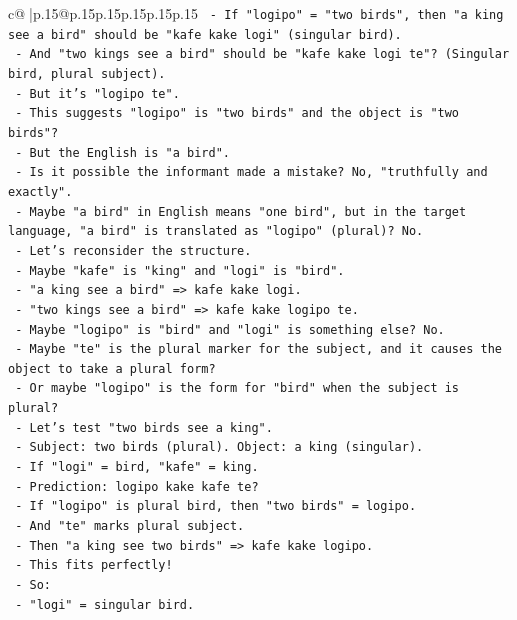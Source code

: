 \documentclass{article}
\begin{document}
{\begin{supertabular}{c@{$\;$}|p{.15\linewidth}@{}p{.15\linewidth}p{.15\linewidth}p{.15\linewidth}p{.15\linewidth}p{.15\linewidth}}
{{{\texttt{  {-} If "logipo" = "two birds", then "a king see a bird" should be "kafe kake logi" (singular bird).} \\
\texttt{  {-} And "two kings see a bird" should be "kafe kake logi te"? (Singular bird, plural subject).} \\
\texttt{  {-} But it's "logipo te".} \\
\texttt{  {-} This suggests "logipo" is "two birds" and the object is "two birds"?} \\
\texttt{  {-} But the English is "a bird".} \\
\texttt{  {-} Is it possible the informant made a mistake? No, "truthfully and exactly".} \\
\texttt{  {-} Maybe "a bird" in English means "one bird", but in the target language, "a bird" is translated as "logipo" (plural)? No.} \\
\texttt{  {-} Let's reconsider the structure.} \\
\texttt{  {-} Maybe "kafe" is "king" and "logi" is "bird".} \\
\texttt{  {-} "a king see a bird" => kafe kake logi.} \\
\texttt{  {-} "two kings see a bird" => kafe kake logipo te.} \\
\texttt{  {-} Maybe "logipo" is "bird" and "logi" is something else? No.} \\
\texttt{  {-} Maybe "te" is the plural marker for the subject, and it causes the object to take a plural form?} \\
\texttt{  {-} Or maybe "logipo" is the form for "bird" when the subject is plural?} \\
\texttt{  {-} Let's test "two birds see a king".} \\
\texttt{  {-} Subject: two birds (plural). Object: a king (singular).} \\
\texttt{  {-} If "logi" = bird, "kafe" = king.} \\
\texttt{  {-} Prediction: logipo kake kafe te?} \\
\texttt{  {-} If "logipo" is plural bird, then "two birds" = logipo.} \\
\texttt{  {-} And "te" marks plural subject.} \\
\texttt{  {-} Then "a king see two birds" => kafe kake logipo.} \\
\texttt{  {-} This fits perfectly!} \\
\texttt{  {-} So:} \\
\texttt{    {-} "logi" = singular bird.} \\
}}}
\end{supertabular}}
\end{document}
